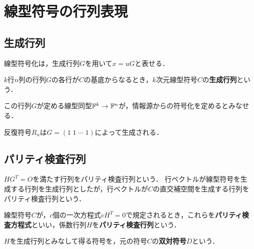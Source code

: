 \documentclass[uplatex,dvipdfmx]{jsreport}
\begin{document}
\section{線型符号の行列表現}

\subsection{生成行列}

\begin{tcolorbox}[colframe=ForestGreen, colback=ForestGreen!10!white,breakable,colbacktitle=ForestGreen!40!white,coltitle=black,fonttitle=\bfseries\sffamily,
title=]
    線型符号化は，生成行列$G$を用いて$x=uG$と表せる．
\end{tcolorbox}

\begin{definition}
    $k$行$n$列の行列$G$の各行が$C$の基底からなるとき，$k$次元線型符号$C$の\textbf{生成行列}という．
\end{definition}
\begin{remarks}
    この行列$G$が定める線型同型$\mathbb{F}^k\to\mathbb{F}^n$が，情報源からの符号化を定めるとみなせる．
\end{remarks}

\begin{example}
    反復符号$R_n$は$G=(1\;1\;\cdots\;1)$によって生成される．
\end{example}

\subsection{パリティ検査行列}

\begin{tcolorbox}[colframe=ForestGreen, colback=ForestGreen!10!white,breakable,colbacktitle=ForestGreen!40!white,coltitle=black,fonttitle=\bfseries\sffamily,
title=]
    $HG^T=O$を満たす行列をパリティ検査行列という．
    行ベクトルが線型符号を生成する行列を生成行列としたが，行ベクトルが$C$の直交補空間を生成する行列をパリティ検査行列という．
\end{tcolorbox}

\begin{definition}
    線型符号$C$が，$c$個の一次方程式$vH^T=0$で規定されるとき，これらを\textbf{パリティ検査方程式}といい，係数行列$H$を\textbf{パリティ検査行列}という．
\end{definition}

\begin{definition}
    $H$を生成行列とみなして得る符号を，元の符号$C$の\textbf{双対符号}$D$という．
\end{definition}
\end{document}
